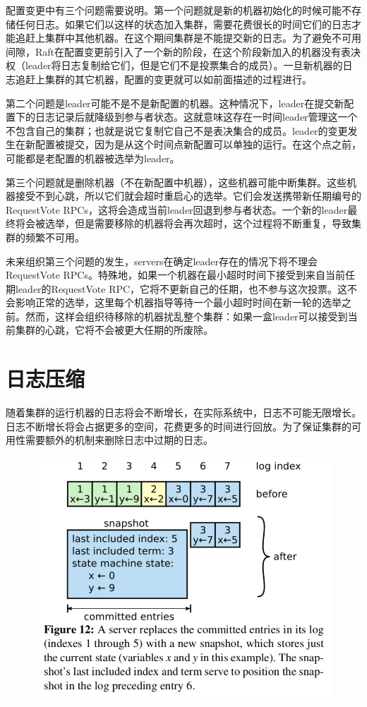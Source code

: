 \documentclass[journal]{IEEEtran}
\begin{document}
配置变更中有三个问题需要说明。第一个问题就是新的机器初始化的时候可能不存储任何日志。如果它们以这样的状态加入集群，需要花费很长的时间它们的日志才能追赶上集群中其他机器。在这个期间集群是不能提交新的日志。为了避免不可用间隙，Raft在配置变更前引入了一个新的阶段，在这个阶段新加入的机器没有表决权（leader将日志复制给它们，但是它们不是投票集合的成员）。一旦新机器的日志追赶上集群的其它机器，配置的变更就可以如前面描述的过程进行。

第二个问题是leader可能不是不是新配置的机器。这种情况下，leader在提交新配置下的日志记录后就降级到参与者状态。这就意味这存在一时间leader管理这一个不包含自己的集群；也就是说它复制它自己不是表决集合的成员。leader的变更发生在新配置被提交，因为是从这个时间点新配置可以单独的运行。在这个点之前，可能都是老配置的机器被选举为leader。

第三个问题就是删除机器（不在新配置中机器），这些机器可能中断集群。这些机器接受不到心跳，所以它们就会超时重启心的选举。它们会发送携带新任期编号的RequestVote RPCs，这将会造成当前leader回退到参与者状态。一个新的leader最终将会被选举，但是需要移除的机器将会再次超时，这个过程将不断重复，导致集群的频繁不可用。

未来组织第三个问题的发生，servers在确定leader存在的情况下将不理会RequestVote RPCs。特殊地，如果一个机器在最小超时时间下接受到来自当前任期leader的RequestVote RPC，它将不更新自己的任期，也不参与这次投票。这不会影响正常的选举，这里每个机器指导等待一个最小超时时间在新一轮的选举之前。然而，这样会组织待移除的机器扰乱整个集群：如果一盒leader可以接受到当前集群的心跳，它将不会被更大任期的所废除。

\section{日志压缩}
随着集群的运行机器的日志将会不断增长，在实际系统中，日志不可能无限增长。日志不断增长将会占据更多的空间，花费更多的时间进行回放。为了保证集群的可用性需要额外的机制来删除日志中过期的日志。
\begin{figure}[htbp]
\begin{center}
\includegraphics[width=1\linewidth]{./fig12.png}
\end{center}
\end{figure}
\end{document}
